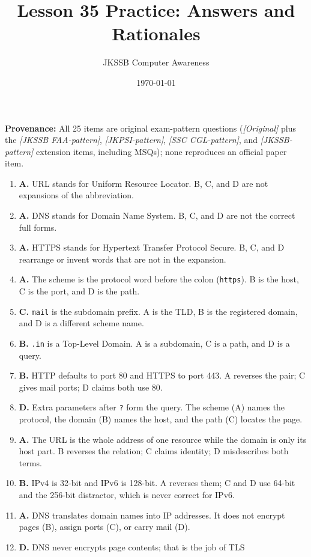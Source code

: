 \documentclass[11pt]{article}
\title{Lesson 35 Practice: Answers and Rationales}
\author{JKSSB Computer Awareness}
\date{\today}
\begin{document}
\maketitle
\noindent\textbf{Provenance:} All 25 items are original exam-pattern questions (\textit{[Original]} plus the \textit{[JKSSB FAA-pattern]}, \textit{[JKPSI-pattern]}, \textit{[SSC CGL-pattern]}, and \textit{[JKSSB-pattern]} extension items, including MSQs); none reproduces an official paper item.
\begin{enumerate}[label=\textbf{Q\arabic*.}, leftmargin=*]
\item \textbf{A.} URL stands for Uniform Resource Locator. B, C, and D are
  not expansions of the abbreviation.
\item \textbf{A.} DNS stands for Domain Name System. B, C, and D are not the
  correct full forms.
\item \textbf{A.} HTTPS stands for Hypertext Transfer Protocol Secure. B,
  C, and D rearrange or invent words that are not in the expansion.
\item \textbf{A.} The scheme is the protocol word before the colon
  (\texttt{https}). B is the host, C is the port, and D is the path.
\item \textbf{C.} \texttt{mail} is the subdomain prefix. A is the TLD, B
  is the registered domain, and D is a different scheme name.
\item \textbf{B.} \texttt{.in} is a Top-Level Domain. A is a subdomain, C
  is a path, and D is a query.
\item \textbf{B.} HTTP defaults to port 80 and HTTPS to port 443. A reverses
  the pair; C gives mail ports; D claims both use 80.
\item \textbf{D.} Extra parameters after \texttt{?} form the query. The
  scheme (A) names the protocol, the domain (B) names the host, and the
  path (C) locates the page.
\item \textbf{A.} The URL is the whole address of one resource while the
  domain is only its host part. B reverses the relation; C claims identity;
  D misdescribes both terms.
\item \textbf{B.} IPv4 is 32-bit and IPv6 is 128-bit. A reverses them; C
  and D use 64-bit and the 256-bit distractor, which is never correct for
  IPv6.
\item \textbf{A.} DNS translates domain names into IP addresses. It does not
  encrypt pages (B), assign ports (C), or carry mail (D).
\item \textbf{D.} DNS never encrypts page contents; that is the job of TLS

\end{enumerate}
\end{document}
